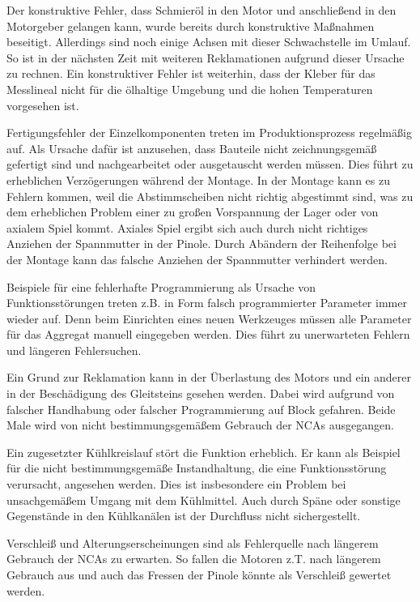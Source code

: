 Der konstruktive Fehler, dass Schmieröl in den Motor und anschließend in den Motorgeber gelangen kann, wurde bereits durch konstruktive Maßnahmen beseitigt. Allerdings sind noch einige Achsen mit dieser Schwachstelle im Umlauf. So ist in der nächsten Zeit mit weiteren Reklamationen aufgrund dieser Ursache zu rechnen. Ein konstruktiver Fehler ist weiterhin, dass der Kleber für das Messlineal nicht für die ölhaltige Umgebung und die hohen Temperaturen vorgesehen ist.


 Fertigungsfehler der Einzelkomponenten treten im Produktionsprozess regelmäßig auf. Als Ursache dafür ist anzusehen, dass Bauteile nicht zeichnungsgemäß gefertigt sind und nachgearbeitet oder ausgetauscht werden müssen. Dies führt zu erheblichen Verzögerungen während der Montage. In der Montage kann es zu Fehlern kommen, weil die Abstimmscheiben nicht richtig abgestimmt sind, was zu dem erheblichen Problem einer zu großen Vorspannung der Lager oder von axialem Spiel kommt. Axiales Spiel ergibt sich auch durch nicht richtiges Anziehen der Spannmutter in der Pinole. Durch Abändern der Reihenfolge bei der Montage kann das falsche Anziehen der Spannmutter verhindert werden.





Beispiele für eine fehlerhafte Programmierung als Ursache von Funktionsstörungen treten z.B. in Form falsch programmierter Parameter immer wieder auf. Denn beim Einrichten eines neuen Werkzeuges müssen alle Parameter für das Aggregat manuell eingegeben werden. Dies führt zu unerwarteten Fehlern und längeren Fehlersuchen.


Ein Grund zur Reklamation kann in der Überlastung des Motors und ein anderer in der Beschädigung des Gleitsteins gesehen werden. Dabei  wird aufgrund von falscher Handhabung oder falscher Programmierung auf Block gefahren. Beide Male wird von  nicht bestimmungsgemäßem Gebrauch der NCAs ausgegangen.

Ein zugesetzter Kühlkreislauf stört die Funktion erheblich. Er kann als Beispiel für die nicht bestimmungsgemäße Instandhaltung, die eine Funktionsstörung verursacht, angesehen werden. Dies ist insbesondere ein Problem bei unsachgemäßem Umgang mit dem Kühlmittel. Auch durch Späne oder sonstige Gegenstände in den Kühlkanälen ist der Durchfluss nicht sichergestellt.


Verschleiß und Alterungserscheinungen sind als Fehlerquelle nach längerem Gebrauch der NCAs zu erwarten. So fallen die Motoren z.T. nach längerem Gebrauch aus und auch das Fressen der Pinole könnte als Verschleiß gewertet werden.


